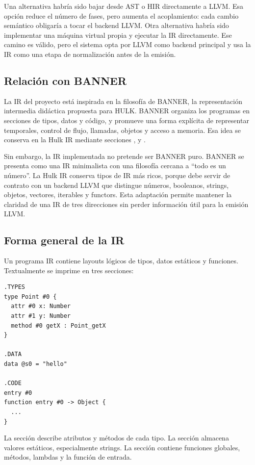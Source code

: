 \documentclass[12pt,letterpaper]{article}
\newcommand{\repo}[1]{\texttt{\detokenize{#1}}}
\newcommand{\hulk}{\textsc{HULK}}
\newcommand{\irname}{Hulk IR}
\begin{document}
Una alternativa habría sido bajar desde AST o HIR directamente a LLVM. Esa opción reduce el número de fases, pero aumenta el acoplamiento: cada cambio semántico obligaría a tocar el backend LLVM. Otra alternativa habría sido implementar una máquina virtual propia y ejecutar la IR directamente. Ese camino es válido, pero el sistema opta por LLVM como backend principal y usa la IR como una etapa de normalización antes de la emisión.

\subsection{Relación con BANNER}

La IR del proyecto está inspirada en la filosofía de BANNER, la representación intermedia didáctica propuesta para \hulk{}. BANNER organiza los programas en secciones de tipos, datos y código, y promueve una forma explícita de representar temporales, control de flujo, llamadas, objetos y acceso a memoria. Esa idea se conserva en la \irname{} mediante secciones \repo{.TYPES}, \repo{.DATA} y \repo{.CODE}.

Sin embargo, la IR implementada no pretende ser BANNER puro. BANNER se presenta como una IR minimalista con una filosofía cercana a ``todo es un número''. La \irname{} conserva tipos de IR más ricos, porque debe servir de contrato con un backend LLVM que distingue números, booleanos, strings, objetos, vectores, iterables y functors. Esta adaptación permite mantener la claridad de una IR de tres direcciones sin perder información útil para la emisión LLVM.

\subsection{Forma general de la IR}

Un programa IR contiene layouts lógicos de tipos, datos estáticos y funciones. Textualmente se imprime en tres secciones:

\begin{lstlisting}[language=IR,caption={Estructura textual de la IR}]
.TYPES
type Point #0 {
  attr #0 x: Number
  attr #1 y: Number
  method #0 getX : Point_getX
}

.DATA
data @s0 = "hello"

.CODE
entry #0
function entry #0 -> Object {
  ...
}
\end{lstlisting}

La sección \repo{.TYPES} describe atributos y métodos de cada tipo. La sección \repo{.DATA} almacena valores estáticos, especialmente strings. La sección \repo{.CODE} contiene funciones globales, métodos, lambdas y la función de entrada.
\end{document}
